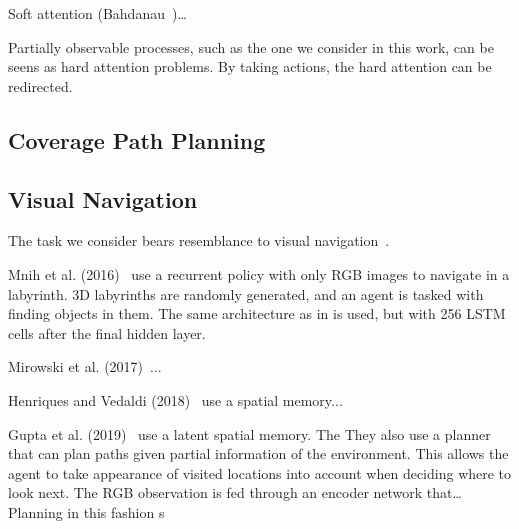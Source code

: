 
\cite{minut_mahadevan_2001}

\cite{mnih_attention_2014}

Soft attention (Bahdanau~\cite{bahdanau_attention_2016})\dots

Partially observable processes, such as the one we consider in this work, can be seens as hard attention problems.
By taking actions, the hard attention can be redirected.

\subsection{Coverage Path Planning}

\cite{galceran_carreras_2013} %

\cite{krishna_tetromino_2020} %

\subsection{Visual Navigation}

The task we consider bears resemblance to visual navigation~\cite{zeng_survey_2020}. %





Mnih et al. (2016)~\cite{mnih_asynchronous_2016} use a recurrent policy with only RGB images to navigate in a labyrinth.
3D labyrinths are randomly generated, and an agent is tasked with finding objects in them.
The same architecture as in \cite{mnih_human_2015} is used, but with 256 LSTM cells after the final hidden layer.



Mirowski et al. (2017)~\cite{mirowski_navigate_2017}...

Henriques and Vedaldi (2018)~\cite{henriques_vedaldi_2018} use a spatial memory...

Gupta et al. (2019)~\cite{gupta_cognitive_2019} use a latent spatial memory.
The 
They also use a planner that can plan paths given partial information of the environment.
This allows the agent to take appearance of visited locations into account when deciding where to look next.
The RGB observation is fed through an encoder network that\dots
Planning in this fashion s


